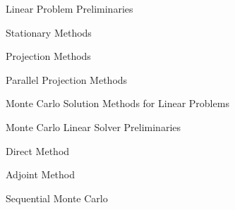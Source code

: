 \documentclass{beamer}
\begin{document}
\begin{frame}{Linear Problem Preliminaries}

\end{frame}

\begin{frame}{Stationary Methods}

\end{frame}

\begin{frame}{Projection Methods}

\end{frame}

\begin{frame}{Parallel Projection Methods}

\end{frame}

\begin{frame}{Monte Carlo Solution Methods for Linear Problems}

\end{frame}

\begin{frame}{Monte Carlo Linear Solver Preliminaries}

\end{frame}

\begin{frame}{Direct Method}

\end{frame}

\begin{frame}{Adjoint Method}

\end{frame}

\begin{frame}{Sequential Monte Carlo}

\end{frame}
\end{document}
